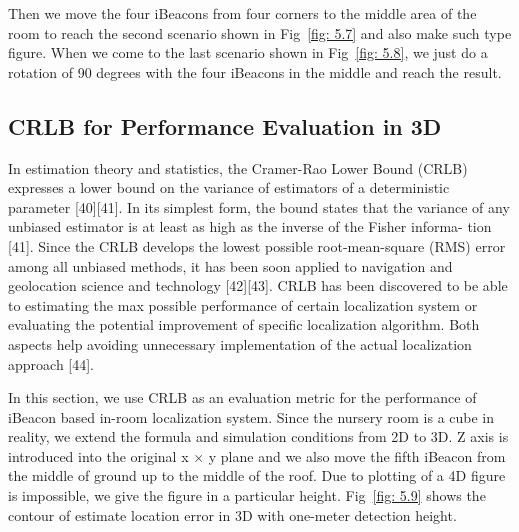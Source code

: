 \documentclass[12pt]{report}
\begin{document}
Then we move the four iBeacons from four corners to the middle area of the room to reach the second scenario shown in Fig~\ref{fig: 5.7} and also make such type figure. When we come to the last scenario shown in Fig~\ref{fig: 5.8}, we just do a rotation of 90 degrees with the four iBeacons in the middle and reach the result. 

\subsection{CRLB for Performance Evaluation in 3D}
In estimation theory and statistics, the Cramer-Rao Lower Bound (CRLB) expresses a lower bound on the variance of estimators of a deterministic parameter [40][41]. In its simplest form, the bound states that the variance of any unbiased estimator is at least as high as the inverse of the Fisher informa- tion [41]. Since the CRLB develops the lowest possible root-mean-square (RMS) error among all unbiased methods, it has been soon applied to navigation and geolocation science and technology [42][43]. CRLB has been discovered to be able to estimating the max possible performance of certain localization system or evaluating the potential improvement of specific localization algorithm. Both aspects help avoiding unnecessary implementation of the actual localization approach [44].

In this section, we use CRLB as an evaluation metric for the performance of iBeacon based in-room localization system. Since the nursery room is a cube in reality, we extend the formula and simulation conditions from 2D to 3D. Z axis is introduced into the original x × y plane and we also move the fifth iBeacon from the middle of ground up to the middle of the roof. Due to plotting of a 4D figure is impossible, we give the figure in a particular height. Fig~\ref{fig: 5.9} shows the contour of estimate location error in 3D with one-meter detection height.
\end{document}
